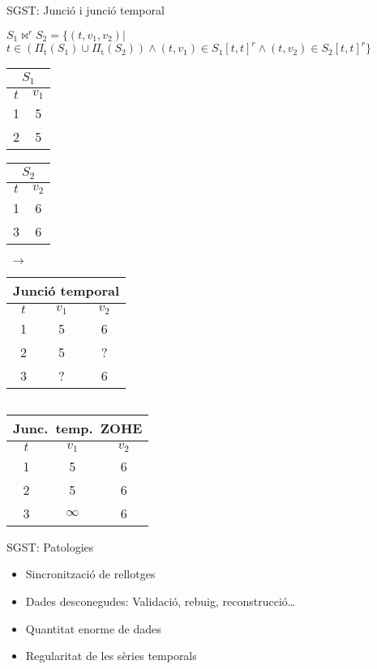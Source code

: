 \begin{frame}{SGST: Junció i junció temporal }
\begin{center}
  \begin{definition}
  $S_1 \Join^r S_2 = \{ (t,v_1,v_2) |$\\
{\hfill
  $t \in
  (\Pi_{\text{t}}(S_1) \cup
  \Pi_{\text{t}}(S_2))\wedge (t,v_1) \in S_1[t,t]^r
  \wedge (t,v_2) \in S_2[t,t]^r \}$}
\end{definition}
{\small
\begin{tabular}[h]{|c|c|}
    \multicolumn{2}{c}{$S_1$} \\ \hline
      $t$ & $v_1$ \\\hline
      1 & 5 \\
      2 & 5 \\\hline
    \end{tabular}
    \begin{tabular}[h]{|c|c|}
    \multicolumn{2}{c}{$S_2$} \\ \hline
      $t$ & $v_2$ \\\hline
      1 & 6 \\
      3 & 6 \\\hline
    \end{tabular}$\;\longrightarrow\;$
    \begin{tabular}[h]{|c|c|c|}
    \multicolumn{3}{c}{Junció temporal} \\ \hline
      $t$ & $v_1$ & $v_2$ \\\hline
      1 & 5 & 6  \\
      2 & 5 & ?  \\
      3 & ? & 6\\\hline
    \end{tabular}$\quad$
    \begin{tabular}[h]{|c|c|c|}
    \multicolumn{3}{c}{Junc.~temp.~ZOHE} \\ \hline
      $t$ & $v_1$ & $v_2$ \\\hline
      1 & 5 & 6  \\
      2 & 5 & 6  \\
      3 & $\infty$ & 6\\\hline
    \end{tabular}
}
 


 \end{center}


\end{frame}


\begin{frame}{SGST: Patologies}


  \begin{itemize}

    \item Sincronització de rellotges \parencite{kopetz11:realtime}
    \item Dades desconegudes: Validació, rebuig, reconstrucció\dots
    \item Quantitat enorme de dades
    \item Regularitat de les sèries temporals
  \end{itemize}
  

\end{frame}




